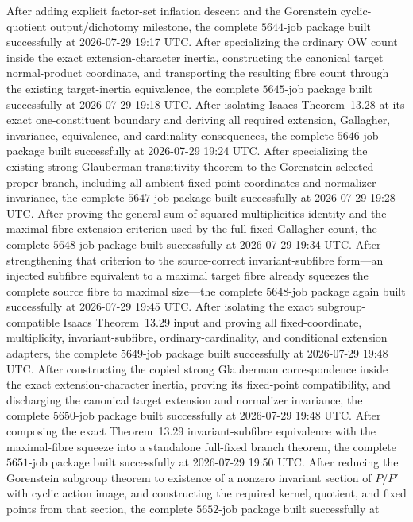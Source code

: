 \documentclass[11pt]{article}
\begin{document}
After adding explicit factor-set inflation descent and the Gorenstein
cyclic-quotient output/dichotomy milestone, the complete
\(5644\)-job package built successfully at 2026-07-29 19:17 UTC.
After specializing the ordinary OW count inside the exact
extension-character inertia, constructing the canonical target
normal-product coordinate, and transporting the resulting fibre count
through the existing target-inertia equivalence, the complete
\(5645\)-job package built successfully at 2026-07-29 19:18 UTC.
After isolating Isaacs Theorem~13.28 at its exact one-constituent boundary
and deriving all required extension, Gallagher, invariance, equivalence,
and cardinality consequences, the complete \(5646\)-job package built
successfully at 2026-07-29 19:24 UTC.
After specializing the existing strong Glauberman transitivity theorem to
the Gorenstein-selected proper branch, including all ambient fixed-point
coordinates and normalizer invariance, the complete \(5647\)-job package
built successfully at 2026-07-29 19:28 UTC.
After proving the general sum-of-squared-multiplicities identity and the
maximal-fibre extension criterion used by the full-fixed Gallagher count,
the complete \(5648\)-job package built successfully at
2026-07-29 19:34 UTC.
After strengthening that criterion to the source-correct invariant-subfibre
form---an injected subfibre equivalent to a maximal target fibre already
squeezes the complete source fibre to maximal size---the complete
\(5648\)-job package again built successfully at 2026-07-29 19:45 UTC.
After isolating the exact subgroup-compatible Isaacs Theorem~13.29 input
and proving all fixed-coordinate, multiplicity, invariant-subfibre,
ordinary-cardinality, and conditional extension adapters, the complete
\(5649\)-job package built successfully at 2026-07-29 19:48 UTC.
After constructing the copied strong Glauberman correspondence inside the
exact extension-character inertia, proving its fixed-point compatibility,
and discharging the canonical target extension and normalizer invariance,
the complete \(5650\)-job package built successfully at
2026-07-29 19:48 UTC.
After composing the exact Theorem~13.29 invariant-subfibre equivalence
with the maximal-fibre squeeze into a standalone full-fixed branch theorem,
the complete \(5651\)-job package built successfully at
2026-07-29 19:50 UTC.
After reducing the Gorenstein subgroup theorem to existence of a nonzero
invariant section of \(P/P'\) with cyclic action image, and constructing
the required kernel, quotient, and fixed points from that section, the
complete \(5652\)-job package built successfully at
\end{document}
